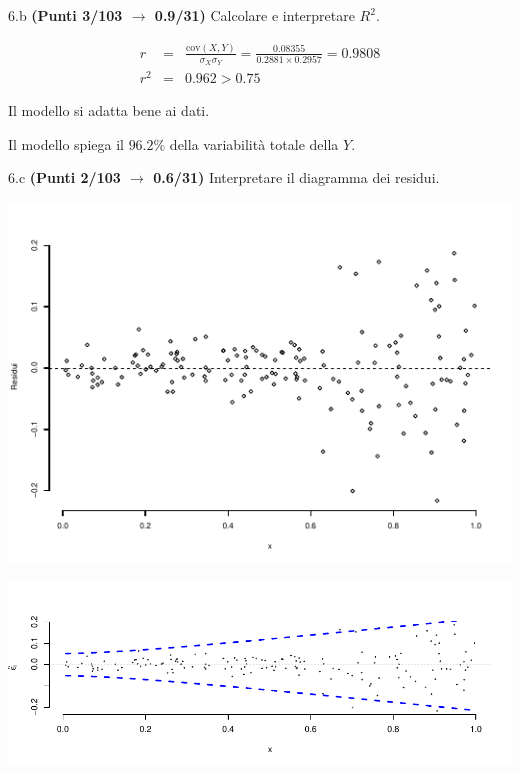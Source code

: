 \documentclass[
  11pt,
]{book}
\theoremstyle{mytheoremstyle}
\theoremstyle{mydefstyle}
\newenvironment{sol}
  {
  \begin{tcolorbox}[enhanced,breakable,arc=0.1mm,boxrule=1pt,colback=white,colframe=iblue,
  title=\bf \fontfamily{lmss}\selectfont \hspace{.5 cm} Soluzione,drop fuzzy shadow]

}{
\end{tcolorbox}
  }
\begin{document}
6.b \textbf{(Punti 3/103 \(\rightarrow\) 0.9/31)} Calcolare e interpretare \(R^2\).

\begin{sol}
\begin{eqnarray*}
r&=&\frac{\text{cov}(X,Y)}{\sigma_X\sigma_Y}=\frac{ 0.08355 }{ 0.2881 \times 0.2957 }= 0.9808 \\ 
r^2&=& 0.962 > 0.75
\end{eqnarray*}

Il modello si adatta bene ai dati.

Il modello spiega il \(96.2\%\) della variabilità totale della \(Y\).

\end{sol}

6.c \textbf{(Punti 2/103 \(\rightarrow\) 0.6/31)} Interpretare il diagramma dei residui.

\begin{center}\includegraphics{Esami_passati_con_soluzioni_files/figure-latex/2023-14,-1} \end{center}

\begin{sol}

\begin{center}\includegraphics{Esami_passati_con_soluzioni_files/figure-latex/2023-15,-1} \end{center}

\end{sol}
\end{document}
